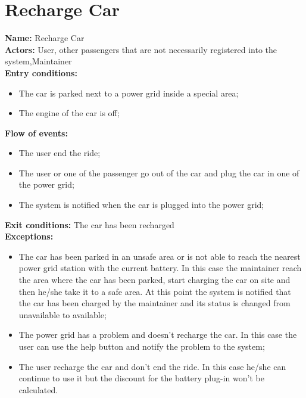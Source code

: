 \section*{Recharge Car}
\textbf{Name:} Recharge Car\\
\textbf{Actors:} User, other passengers that are not necessarily registered into the system,Maintainer\\
\textbf{Entry conditions:}
\begin{itemize}
\item The car is parked next to a power grid inside a special area;
\item The engine of the car is off;
\end{itemize}
\textbf{Flow of events:}
\begin{itemize}
\item The user end the ride;
\item The user or one of the passenger go out of the car and plug the car in one of the power grid;
\item The system is notified when the car is plugged into the power grid;
\end{itemize}
\textbf{Exit conditions:} The car has been recharged \\
\textbf{Exceptions:}
\begin{itemize}
\item The car has been parked in an unsafe area or is not able to reach the nearest power grid station with the current battery. In this case the maintainer reach the area where the car has been parked, start charging the car on site and then he/she take it to a safe area. At this point the system is notified that the car has been charged by the maintainer and its status is changed from unavailable to available;
\item The power grid has  a problem and doesn't recharge the car. In this case the user can use the help button and notify the problem to the system;
\item The user recharge the car and don't end the ride. In this case he/she can continue to use it but the discount for the battery plug-in won't be calculated.
\end{itemize}

